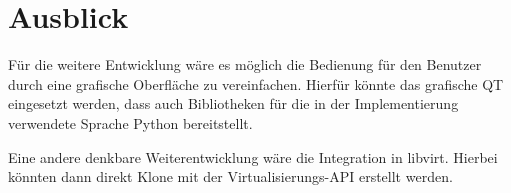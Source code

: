 \section{Ausblick}
Für die weitere Entwicklung wäre es möglich die Bedienung für den Benutzer durch eine grafische Oberfläche zu vereinfachen. Hierfür könnte das grafische QT eingesetzt werden, dass auch Bibliotheken für die in der Implementierung verwendete Sprache Python bereitstellt.

Eine andere denkbare Weiterentwicklung wäre die Integration in libvirt. Hierbei könnten dann direkt Klone mit der Virtualisierungs-API erstellt werden.